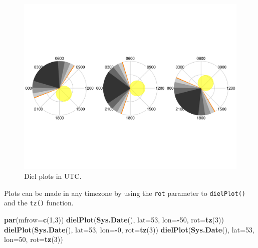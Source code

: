 \documentclass[
]{book}
\newenvironment{Shaded}{\begin{snugshade}}{\end{snugshade}}
\newcommand{\AttributeTok}[1]{\textcolor[rgb]{0.13,0.29,0.53}{#1}}
\newcommand{\DecValTok}[1]{\textcolor[rgb]{0.00,0.00,0.81}{#1}}
\newcommand{\FunctionTok}[1]{\textcolor[rgb]{0.13,0.29,0.53}{\textbf{#1}}}
\newcommand{\NormalTok}[1]{#1}
\newcommand{\SpecialCharTok}[1]{\textcolor[rgb]{0.81,0.36,0.00}{\textbf{#1}}}
\begin{document}
\begin{figure}

{\centering \includegraphics[width=0.9\linewidth]{_main_files/figure-latex/diel-plot-no-tz-1} 

}

\caption{Diel plots in UTC.}\label{fig:diel-plot-no-tz}
\end{figure}

Plots can be made in any timezone by using the \texttt{rot} parameter to \texttt{dielPlot()} and the \texttt{tz()} function.

\begin{Shaded}
\begin{Highlighting}[]
\FunctionTok{par}\NormalTok{(}\AttributeTok{mfrow=}\FunctionTok{c}\NormalTok{(}\DecValTok{1}\NormalTok{,}\DecValTok{3}\NormalTok{))}
\FunctionTok{dielPlot}\NormalTok{(}\FunctionTok{Sys.Date}\NormalTok{(), }\AttributeTok{lat=}\DecValTok{53}\NormalTok{, }\AttributeTok{lon=}\SpecialCharTok{{-}}\DecValTok{50}\NormalTok{, }\AttributeTok{rot=}\FunctionTok{tz}\NormalTok{(}\DecValTok{3}\NormalTok{))}
\FunctionTok{dielPlot}\NormalTok{(}\FunctionTok{Sys.Date}\NormalTok{(), }\AttributeTok{lat=}\DecValTok{53}\NormalTok{, }\AttributeTok{lon=}\SpecialCharTok{{-}}\DecValTok{0}\NormalTok{, }\AttributeTok{rot=}\FunctionTok{tz}\NormalTok{(}\DecValTok{3}\NormalTok{))}
\FunctionTok{dielPlot}\NormalTok{(}\FunctionTok{Sys.Date}\NormalTok{(), }\AttributeTok{lat=}\DecValTok{53}\NormalTok{, }\AttributeTok{lon=}\DecValTok{50}\NormalTok{, }\AttributeTok{rot=}\FunctionTok{tz}\NormalTok{(}\DecValTok{3}\NormalTok{))}
\end{Highlighting}
\end{Shaded}
\end{document}
